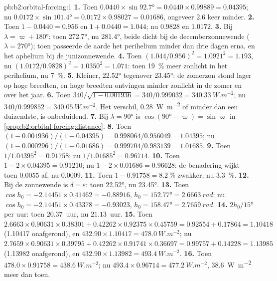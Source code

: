 \begin{solution}{pb:b2:orbital-forcing:1}
\textbf{1.} Toen $0.0440 \times \sin\ang{92.7} = 0.0440 \times 0.99889 = 0.04395$; nu $0.0172 \times
\sin\ang{101.4} = 0.0172 \times 0.98027 = 0.01686$, ongeveer 2.6 keer minder.
\textbf{2.} Toen $1 - 0.0440 = 0.956$ en $1 + 0.0440 = 1.044$; nu $0.9828$ en $1.0172$.
\textbf{3.} Bij $\lambda = \varpi + \ang{180}$: toen \ang{272.7}, nu \ang{281.4}, beide dicht bij de
decemberzonnewende ($\lambda = \ang{270}$); toen passeerde de aarde het perihelium minder dan drie dagen
erna, en het aphelium bij de junizonnewende.
\textbf{4.} Toen $(1.044/0.956)^2 = 1.0921^2 = 1.193$, nu $(1.0172/0.9828)^2 = 1.0350^2 = 1.071$:
toen \qty{19}{\percent} meer zonlicht in het perihelium, nu \qty{7}{\percent}.
\textbf{5.} Kleiner, \ang{22.52} tegenover \ang{23.45}: de zomerzon stond lager op hoge breedten,
en hoge breedten ontvingen minder zonlicht in de zomer en over het jaar.
\textbf{6.} Toen $340/\sqrt{1 - 0.001936} = 340/0.999032 = \qty{340.33}{W.m^{-2}}$; nu $340/0.999852
= \qty{340.05}{W.m^{-2}}$. Het verschil, \qty{0.28}{W.m^{-2}} of minder dan een duizendste,
is onbeduidend.
\textbf{7.} Bij $\lambda = \ang{90}$ is $\cos(\ang{90} - \varpi) = \sin\varpi$ in
\cref{prop:b2:orbital-forcing:distance}.
\textbf{8.} Toen $(1 - 0.001936)/(1 - 0.04395) = 0.998064/0.956049 = 1.04395$; nu $(1 -
0.000296)/(1 - 0.01686) = 0.999704/0.983139 = 1.01685$.
\textbf{9.} Toen $1/1.04395^2 = 0.91758$; nu $1/1.01685^2 = 0.96714$.
\textbf{10.} Toen $1 - 2 \times 0.04395 = 0.91210$; nu $1 - 2 \times 0.01686 = 0.96628$: de
benadering wijkt toen $0.0055$ af, nu $0.0009$.
\textbf{11.} Toen $1 - 0.91758 = \qty{8.2}{\percent}$ zwakker, nu \qty{3.3}{\percent}.
\textbf{12.} Bij de zonnewende is $\delta = \varepsilon$: toen \ang{22.52}, nu \ang{23.45}.
\textbf{13.} Toen $\cos h_0 = -2.14451 \times 0.41462 = -0.88916$, $h_0 = \ang{152.77} =
\qty{2.6663}{rad}$; nu $\cos h_0 = -2.14451 \times 0.43378 = -0.93023$, $h_0 = \ang{158.47} =
\qty{2.7659}{rad}$.
\textbf{14.} $2h_0/\ang{15}$ per uur: toen $20.37$~uur, nu $21.13$~uur.
\textbf{15.} Toen $2.6663 \times 0.90631 \times 0.38301 + 0.42262 \times 0.92375 \times 0.45759 =
0.92554 + 0.17864 = 1.10418$ (\num{1.10417} onafgerond), en $432.90 \times 1.10417 =
\qty{478.0}{W.m^{-2}}$; nu $2.7659 \times 0.90631 \times 0.39795 + 0.42262 \times 0.91741 \times
0.36697 = 0.99757 + 0.14228 = 1.13985$ (\num{1.13982} onafgerond), en $432.90 \times 1.13982 = \qty{493.4}{W.m^{-2}}$.
\textbf{16.} Toen $478.0 \times 0.91758 = \qty{438.6}{W.m^{-2}}$; nu $493.4 \times 0.96714 =
\qty{477.2}{W.m^{-2}}$, \qty{38.6}{W.m^{-2}} meer dan toen.

\end{solution}
